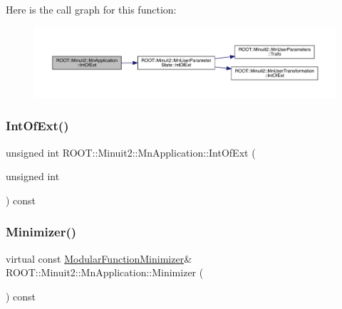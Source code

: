 Here is the call graph for this function\+:
\nopagebreak
\begin{figure}[H]
\begin{center}
\leavevmode
\includegraphics[width=350pt]{df/dd5/classROOT_1_1Minuit2_1_1MnApplication_a7911389abce948da10dd82a8a172afd5_cgraph}
\end{center}
\end{figure}
\mbox{\label{classROOT_1_1Minuit2_1_1MnApplication_a7911389abce948da10dd82a8a172afd5}} 
\subsubsection{\texorpdfstring{IntOfExt()}{IntOfExt()}\hspace{0.1cm}{\footnotesize\ttfamily [3/3]}}
{\footnotesize\ttfamily unsigned int R\+O\+O\+T\+::\+Minuit2\+::\+Mn\+Application\+::\+Int\+Of\+Ext (\begin{DoxyParamCaption}\item[{unsigned int}]{ }\end{DoxyParamCaption}) const}

\mbox{\label{classROOT_1_1Minuit2_1_1MnApplication_a5a8e1e2658b731b5f4023dd1b1594223}} 
\subsubsection{\texorpdfstring{Minimizer()}{Minimizer()}\hspace{0.1cm}{\footnotesize\ttfamily [1/3]}}
{\footnotesize\ttfamily virtual const \mbox{\hyperlink{classROOT_1_1Minuit2_1_1ModularFunctionMinimizer}{Modular\+Function\+Minimizer}}\& R\+O\+O\+T\+::\+Minuit2\+::\+Mn\+Application\+::\+Minimizer (\begin{DoxyParamCaption}{ }\end{DoxyParamCaption}) const\hspace{0.3cm}{\ttfamily [pure virtual]}}



